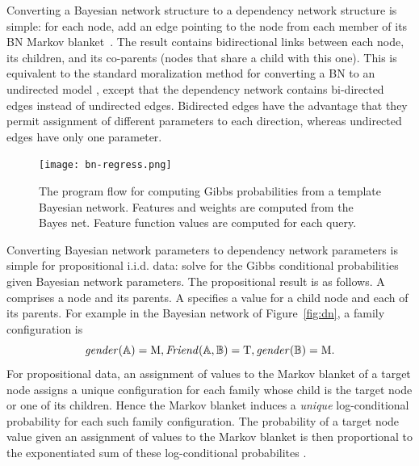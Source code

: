 \documentclass[runningheads,a4paper]{llncs}
\newcommand{\iid}{i.i.d.}
\begin{document}
Converting a Bayesian network structure to a dependency network structure is simple: for each node, add an edge pointing to the node from each member of its BN Markov blanket~\cite{Heckerman2000}.  The result contains  bidirectional links between each node, its children, and its co-parents (nodes that share a child with this one). 
%
This is equivalent to the standard moralization  method for converting a BN to an undirected model \cite{Domingos2009}, except that the dependency network contains bi-directed edges instead of undirected edges. Bidirected edges have the advantage that they permit  assignment of different parameters to each direction, whereas undirected edges have only one parameter.
 
\begin{figure}[t]

\begin{center}
\texttt{[image: bn-regress.png]}
\caption{The program flow for computing Gibbs probabilities from a template Bayesian network. Features and weights are computed from the Bayes net. Feature function values are computed for each query. \label{fig:bn-flow}}
\end{center}

\end{figure}

Converting Bayesian network parameters to dependency network parameters is simple for propositional \iid{} data: solve for the Gibbs conditional probabilities given Bayesian network parameters. The propositional result is as follows. A  comprises a node and its parents. A  specifies a value for a child node and each of its parents. For example in the Bayesian network of Figure~\ref{fig:dn}, a family configuration is 
$$\it{gender}(\mathbb{A}) = \mathrm{M}, \it{Friend}(\mathbb{A},\mathbb{B}) = \mathrm{T}, \it{gender}(\mathbb{B}) = \mathrm{M}.$$
For propositional data, an assignment of values to the Markov blanket of a target node assigns a unique configuration for each family whose child is the target node or one of its children. Hence the Markov blanket induces a {\em unique} log-conditional probability for each such family configuration. The probability of a target node value given an assignment of values to the Markov blanket is then proportional to the exponentiated sum of these log-conditional probabilites \cite[Ch.14.5.2]{Russell2010}. 
\end{document}

